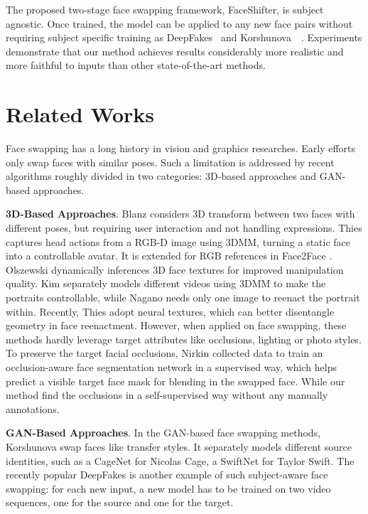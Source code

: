 The proposed two-stage face swapping framework, FaceShifter, is subject agnostic. Once trained, the model can be applied to any new face pairs without requiring subject specific training as DeepFakes~\cite{deepfake} and Korshunova~\etal~\cite{korshunova2017fast}. Experiments demonstrate that our method achieves results considerably more realistic and more faithful to inputs than other state-of-the-art methods.

\section{Related Works}

Face swapping has a long history in vision and graphics researches. Early efforts \cite{bitouk2008face,wang2008facial} only swap faces with similar poses. Such a limitation is addressed by recent algorithms roughly divided in two categories: 3D-based approaches and GAN-based approaches. 

\noindent\textbf{3D-Based Approaches}. Blanz \etal \cite{blanz2004exchanging} considers 3D transform between two faces with different poses, but requiring user interaction and not handling expressions. 
Thies \etal \cite{thies2015real} captures head actions from a RGB-D image using 3DMM, turning a static face into a controllable avatar. It is extended for RGB references in Face2Face \cite{thies2016face2face}. 
Olszewski \etal \cite{olszewski2017realistic} dynamically inferences 3D face textures for improved manipulation quality.
Kim \etal \cite{kim2018deep} separately models different videos using 3DMM to make the portraits controllable, while Nagano \etal \cite{nagano2018pagan} needs only one image to reenact the portrait within. 
Recently, Thies \etal \cite{thies2019deferred} adopt neural textures, which can better disentangle geometry in face reenactment.
However, when applied on face swapping, these methods hardly leverage target attributes like occlusions, lighting or photo styles. 
To preserve the target facial occlusions, Nirkin \etal \cite{nirkin2018face,nirkin2019fsgan} collected data to train an occlusion-aware face segmentation network in a supervised way, which helps predict a visible target face mask for blending in the swapped face. While our method find the occlusions in a self-supervised way without any manually annotations.

\noindent\textbf{GAN-Based Approaches}. 
In the GAN-based face swapping methods, Korshunova \etal \cite{korshunova2017fastfaceswap} swap faces like transfer styles. It separately models different source identities, such as a CageNet for Nicolas Cage, a SwiftNet for Taylor Swift.
The recently popular DeepFakes \cite{deepfake} is another example of such subject-aware face swapping: for each new input, a new model has to be trained on two video sequences, one for the source and one for the target. 

